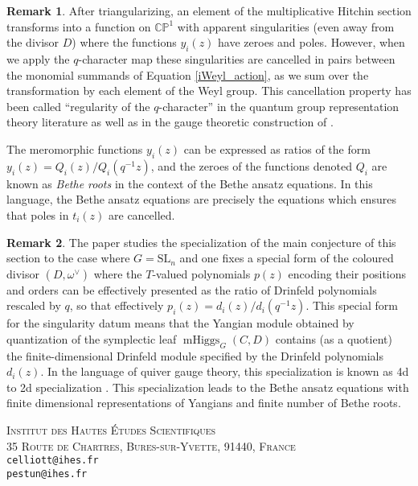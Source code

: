 \documentclass[11pt, oneside, reqno]{amsart}
\theoremstyle{definition} \newtheorem{definition}{Definition}[section]
\theoremstyle{definition} \newtheorem{remark}[definition]{Remark}
\theoremstyle{definition} \newtheorem{remarks}[definition]{Remarks}
\theoremstyle{definition} \newtheorem{question}[definition]{Question}
\theoremstyle{definition} \newtheorem*{note}{Note}
\theoremstyle{definition} \newtheorem{example}[definition]{Example}
\theoremstyle{definition} \newtheorem{examples}[definition]{Examples}
\newcommand{\bb}[1]{\mathbb{#1}}
\newcommand{\SL}{\mathrm{SL}}
\DeclareMathOperator{\mhiggs}{mHiggs}
\begin{document}
\begin{remark}
After triangularizing, an element of the multiplicative Hitchin section transforms into a function on $\bb{CP}^1$ with apparent singularities (even away from the divisor $D$) where the functions $y_{i}(z)$ have zeroes and poles.  However, when we apply the $q$-character map these singularities are cancelled in pairs between the monomial summands of Equation \ref{iWeyl_action}, as we sum over the transformation by each element of the Weyl group.  This cancellation property has been called ``regularity of the $q$-character'' in the quantum group representation theory literature \cite{FrenkelReshetikhin1,FrenkelReshetikhin2} as well as in the gauge theoretic construction of \cite{NekrasovPestunShatashvili,Nekrasov:2015wsu,NekrasovPestun,Kimura:2015rgi}.
 
The meromorphic functions $y_{i}(z)$ can be expressed as ratios of the form $y_{i}(z) = Q_{i}(z)/Q_i(q^{-1}z)$, and the zeroes of the functions denoted $Q_i$ are known as \emph{Bethe roots} in the context of the Bethe ansatz equations.  In this language, the Bethe ansatz equations are precisely the equations which ensures that poles in $t_{i}(z)$ are cancelled. 
\end{remark}

 \begin{remark}
The paper \cite{KoroteevSageZeitlin} studies the specialization of the main conjecture of this section to the case where $G = \SL_n$ and one fixes a special form of the coloured divisor $(D,\omega^\vee)$ where the $T$-valued polynomials $p(z)$ encoding their positions and orders can be effectively presented as the ratio of Drinfeld polynomials rescaled by $q$, so that effectively $p_i(z) = d_{i}(z)/d_{i}(q^{-1}z)$.  This special form for the singularity datum means that the Yangian module obtained by quantization of the symplectic leaf $\mhiggs_G(C,D)$ contains (as a quotient) the finite-dimensional Drinfeld module specified by the Drinfeld polynomials $d_{i}(z)$. In the language of quiver gauge theory, this specialization is known as 4d to 2d specialization \cite{ChenDoreyHollowoodLee, DoreyHollowoodLee}. This specialization leads to the Bethe ansatz equations with finite dimensional representations of Yangians and finite number of Bethe roots. 
\end{remark}




\textsc{Institut des Hautes \'Etudes Scientifiques}\\
\textsc{35 Route de Chartres, Bures-sur-Yvette, 91440, France}\\
\texttt{celliott@ihes.fr}\\ 
\texttt{pestun@ihes.fr}
 
\end{document}
